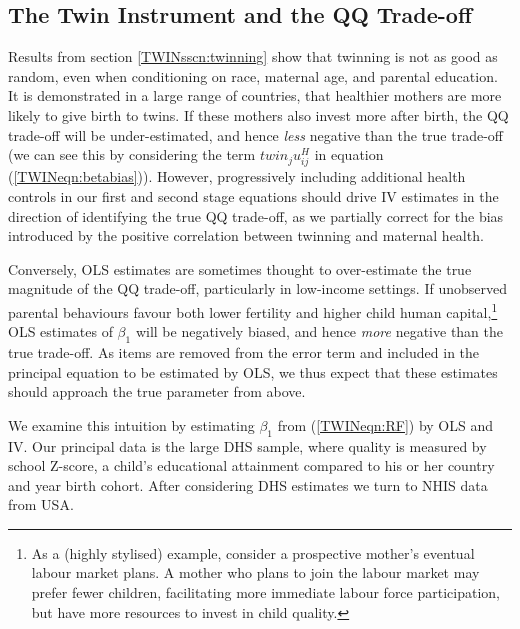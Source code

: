 \subsection{The Twin Instrument and the QQ Trade-off} \label{TWINsscn:QQtwins}
Results from section \ref{TWINsscn:twinning} show that twinning is not as good
as random, even when conditioning on race, maternal age, and parental education. 
It is demonstrated in a large range of countries, that healthier mothers are 
more likely to give birth to twins. If these mothers also invest more after 
birth, the QQ trade-off will be under-estimated, and hence \emph{less} 
negative than the true trade-off (we can see this by considering the term 
$twin_ju^H_{ij}$ in equation (\ref{TWINeqn:betabias})). However, progressively 
including additional health controls in our first and second stage equations 
should drive IV estimates in the direction of identifying the true QQ 
trade-off, as we partially correct for the bias introduced by the positive 
correlation between twinning and maternal health.

Conversely, OLS estimates are sometimes thought to over-estimate the true 
magnitude of the QQ trade-off, particularly in low-income settings.  If 
unobserved parental behaviours favour both lower fertility and higher child 
human capital,\footnote{As a (highly stylised) example, consider a prospective 
mother's eventual labour market plans. A mother who plans to join the labour 
market may prefer fewer children, facilitating more immediate labour force 
participation, but have more resources to invest in child quality.} OLS 
estimates of $\beta_1$ will be negatively biased, and hence \emph{more} negative 
than the true trade-off.  As items are removed from the error term and included 
in the principal equation to be estimated by OLS, we thus expect that these 
estimates should approach the true parameter from above.

We examine this intuition by estimating $\beta_1$ from (\ref{TWINeqn:RF}) by OLS 
and IV. Our principal data is the large DHS sample, where quality is measured by
school Z-score, a child's educational attainment compared to his or her 
country and year birth cohort.  After considering DHS estimates we turn to 
NHIS data from USA.

